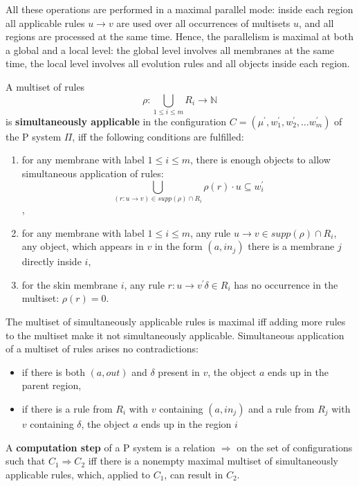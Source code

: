 All these operations are performed in a maximal parallel mode: inside each region all applicable rules $u\rightarrow v$ are used over all occurrences of multisets $u$, and all regions are processed at the same time. Hence, the parallelism is maximal at both a global and a local level: the global level involves all membranes at the same time, the local level involves all evolution rules and all objects inside each region.

\begin{definition}
  A multiset of rules $$\rho: \bigcup_{1\leq i\leq m} R_i \rightarrow \mathbb N$$ is {\bf simultaneously applicable} in the configuration $C = (\mu^\prime, w^\prime_1,w^\prime_2,\ldots w^\prime_m)$ of the P system $\Pi$, iff the following conditions are fulfilled:
  \begin{enumerate}
    \item for any membrane with label $1\leq i\leq m$, there is enough objects to allow simultaneous application of rules: $$ \bigcup_{(r: u\rightarrow v)\in supp(\rho)\cap R_i} \rho(r)\cdot u \subseteq w^\prime_i$$,
    \item for any membrane with label $1\leq i\leq m$, any rule $u\rightarrow v\in supp(\rho)\cap R_i$, any object, which appears in $v$ in the form $(a, in_j)$ there is a membrane $j$ directly inside $i$,
    \item for the skin membrane $i$, any rule $r: u\rightarrow v^\prime\delta\in R_i$ has no occurrence in the multiset: $\rho(r)=0$.
  \end{enumerate}  
\end{definition}

The multiset of simultaneously applicable rules is maximal iff adding more rules to the multiset make it not simultaneously applicable. Simultaneous application of a multiset of rules arises no contradictions:

\begin{itemize}
  \item if there is both $(a, out)$ and $\delta$ present in $v$, the object $a$ ends up in the parent region,
  \item if there is a rule from $R_i$ with $v$ containing $(a,in_j)$ and a rule from $R_j$ with $v$ containing $\delta$, the object $a$ ends up in the region $i$ 
\end{itemize}

\begin{definition}
  A {\bf computation step} of a P system is a relation $\Rightarrow$ on the set of configurations such that $C_1 \Rightarrow C_2$ iff there is a nonempty maximal multiset of simultaneously applicable rules, which, applied to $C_1$, can result in $C_2$.
\end{definition}

